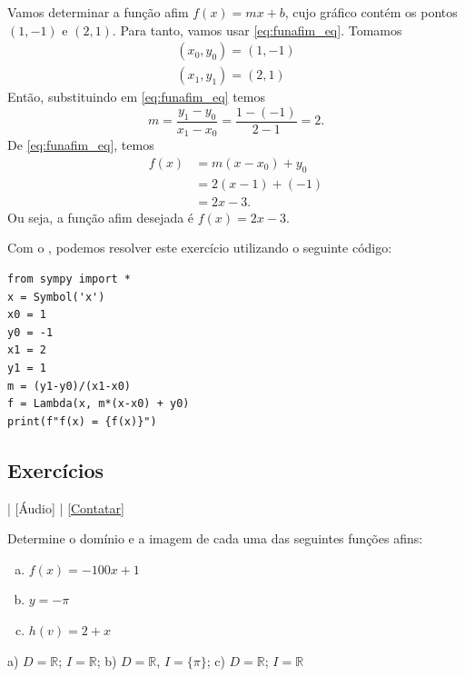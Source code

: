 \begin{ex}
  Vamos determinar a função afim $f(x) = mx + b$, cujo gráfico contém os pontos $(1, -1)$ e $(2, 1)$. Para tanto, vamos usar \eqref{eq:funafim_eq}. Tomamos
  \begin{gather}
    (x_0, y_0) = (1, -1)\\
    (x_1, y_1) = (2, 1)
  \end{gather}
  Então, substituindo em \eqref{eq:funafim_eq} temos
  \begin{equation}
    m = \frac{y_1 - y_0}{x_1 - x_0} = \frac{1 - (-1)}{2 - 1} = 2.
  \end{equation}
  De \eqref{eq:funafim_eq}, temos
  \begin{align}
    f(x) &= m(x-x_0) + y_0\\
         &= 2(x - 1) + (-1) \\
         &= 2x -3.
  \end{align}
  Ou seja, a função afim desejada é $f(x) = 2x - 3$.

  \ifispython
  Com o {\sympy}, podemos resolver este exercício utilizando o seguinte código:
\begin{verbatim}
from sympy import *
x = Symbol('x')
x0 = 1
y0 = -1
x1 = 2
y1 = 1
m = (y1-y0)/(x1-x0)
f = Lambda(x, m*(x-x0) + y0)
print(f"f(x) = {f(x)}")
\end{verbatim}
  \fi
\end{ex}

\subsection*{Exercícios}

\begin{flushright}
  [Vídeo] | [Áudio] | \href{https://phkonzen.github.io/notas/contato.html}{[Contatar]}
\end{flushright}

\begin{exer}
  Determine o domínio e a imagem de cada uma das seguintes funções afins:
  \begin{enumerate}[a)]
  \item $f(x) = -100x + 1$
  \item $y = -\pi$
  \item $h(v) = 2 + x$
  \end{enumerate}
\end{exer}
\begin{resp}
  a) $D=\mathbb{R}$; $I=\mathbb{R}$; b) $D=\mathbb{R}$, $I=\{\pi\}$; c) $D=\mathbb{R}$; $I=\mathbb{R}$
\end{resp}

